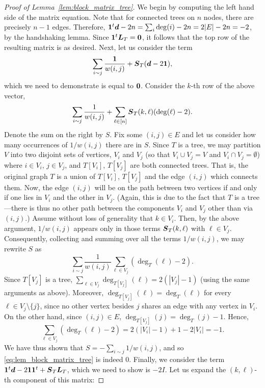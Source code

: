 \begin{proof}[Proof of Lemma~\ref{lem:block_matrix_tree}]
	We begin by computing the left hand side of the matrix equation. Note that for connected trees on $n$ nodes, there are  precisely $n-1$ edges. Therefore, $\vb{1}^t \vb*{d}-2n = \sum_i \deg(i) - 2n = 2|E| -2n = -2$, by the handshaking lemma. Since $\vb{1}^t\vb*{L}_T=\vb{0}$, it follows that the top row of the resulting matrix is as desired. Next, let us consider the term 
	\[\sum_{i\sim j}\frac{\vb{1}}{w(i,j)} + \vb*{S}_T(\vb*{d}-2\vb{1}),\]
	which we need to demonstrate is equal to $\vb{0}$. Consider the $k$-th row of the above vector, 
	\begin{equation}
	\label{eq:lem_block_matrix_tree}
	\sum_{i\sim j}\frac{1}{w(i,j)} + \sum_{\ell\in[n]}\vb*{S}_T(k,\ell)(\deg(\ell)-2).
	\end{equation}
	Denote the sum on the right by $S$. Fix some $(i,j)\in E$ and let us consider how many occurrences of $1/w(i,j)$ there are in $S$. Since $T$ is a tree, we may partition $V$ into two disjoint sets of vertices, $V_i$ and $V_j$ (so that $V_i\cup V_j=V$ and $V_i\cap V_j=\emptyset$) where $i\in V_i$,  $j\in V_j$, and $T[V_i]$, $T[V_j]$ are both connected trees. That is, the original graph $T$ is a union of $T[V_i]$, $T[V_j]$ and the edge $(i,j)$ which connects them. Now, the edge $(i,j)$ will be on the path between two vertices if and only if one lies in $V_i$ and the other in $V_j$. (Again, this is due to the fact that $T$ is a tree---there is thus no other path between the components  $V_i$ and $V_j$ other than via $(i,j)$.)   
	Assume without loss of generality that $k\in V_i$. Then,  by the above argument, $1/w(i,j)$ appears only in those terms $\vb*{S}_T(k,\ell)$ with $\ell\in V_j$. 
	Consequently, collecting and summing over all the terms $1/w(i,j)$, we may rewrite $S$ as 
	\[\sum_{i\sim j} \frac{1}{w(i,j)}\sum_{\ell \in V_j} (\deg_T(\ell)-2).\]
	Since $T[V_j]$ is a tree, $\sum_{\ell\in V_j}\deg_{T[V_j]}(\ell)=2(|V_j|-1)$ (using the same arguments as above). Moreover, $\deg_{T[V_j]}(\ell)=\deg_T(\ell)$ for every $\ell\in V_j\setminus \{j\}$, since no other vertex besides $j$ shares an edge with any vertex in $V_i$. On the other hand, since $(i,j)\in E$,  $\deg_{T[V_j]}(j) = \deg_T(j)-1$. Hence, 
	\[\sum_{\ell\in V_j}(\deg_T(\ell)-2) = 2(|V_i|-1) + 1 - 2|V_i| = -1.\]
	We have thus shown that $S=-\sum_{i\sim j}1/w(i,j)$, and so \eqref{eq:lem_block_matrix_tree} is indeed 0. Finally, we consider the term $\vb{1}^t \vb*{d} - 2\vb{1}\vb{1}^t + \vb*{S}_T\vb*{L}_T$, which we need to show is $-2I$. Let us expand  the $(k,\ell)$-th component of this matrix: 

\end{proof}
